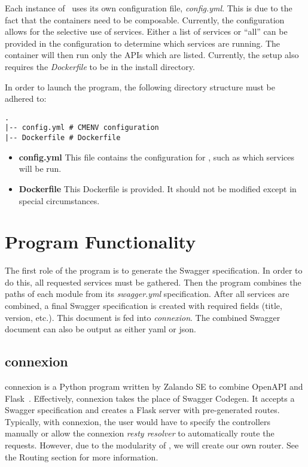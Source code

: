 Each instance of \projectname~uses its own configuration file,
\textit{config.yml}. This is due to the fact that the containers need to
be composable. Currently, the configuration allows for the selective use
of services. Either a list of services or ``all'' can be provided in the
configuration to determine which services are running. The container will
then run only the APIs which are listed. Currently, the setup also requires
the \textit{Dockerfile} to be in the install directory.

In order to launch the program, the following directory structure must be
adhered to:
\begin{verbatim}
.
|-- config.yml # CMENV configuration
|-- Dockerfile # Dockerfile

\end{verbatim}
\begin{itemize}
    \item \textbf{config.yml} This file contains the configuration for
    \projectname, such as which services will be run.
    \item \textbf{Dockerfile} This Dockerfile is provided. It should not be
    modified except in special circumstances.
\end{itemize}

\section{Program Functionality}

The first role of the program is to generate the Swagger specification. In
order to do this, all requested services must be gathered. Then the
program combines the paths of each module from its \textit{swagger.yml}
specification. After all services are combined, a final Swagger specification
is created with required fields (title, version, etc.). This document is fed
into \textit{connexion}. The combined Swagger document can also be output
as either yaml or json.

\subsection{connexion}

connexion is a Python program written by Zalando SE to combine OpenAPI and
Flask~\cite{hid-sp18-526-www-connexion}. Effectively, connexion takes the
place of Swagger Codegen. It accepts a Swagger specification and creates
a Flask server with pre-generated routes. Typically, with connexion, the
user would have to specify the controllers manually or allow the connexion
\textit{resty resolver} to automatically route the requests. However, due
to the modularity of \projectname, we will create our own router. See the
Routing section for more information.

